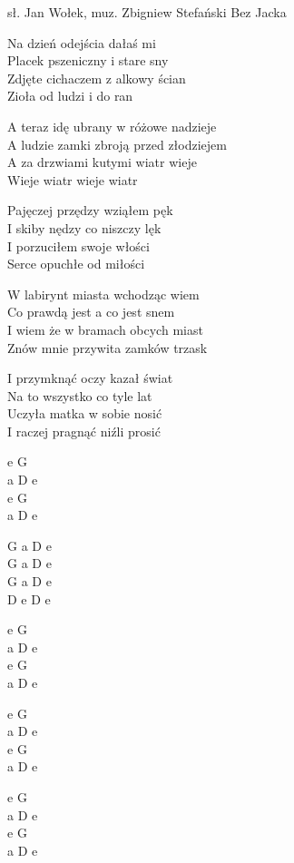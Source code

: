 {sł. Jan Wołek, muz. Zbigniew Stefański}
{Bez Jacka}
\begin{text}
Na dzień odejścia dałaś mi\\
Placek pszeniczny i stare sny\\
Zdjęte cichaczem z alkowy ścian\\
Zioła od ludzi i do ran

A teraz idę ubrany w różowe nadzieje\\
A ludzie zamki zbroją przed złodziejem\\
A za drzwiami kutymi wiatr wieje\\
Wieje wiatr wieje wiatr

Pajęczej przędzy wziąłem pęk\\
I skiby nędzy co niszczy lęk\\
I porzuciłem swoje włości\\
Serce opuchłe od miłości

W labirynt miasta wchodząc wiem\\
Co prawdą jest a co jest snem\\
I wiem że w bramach obcych miast\\
Znów mnie przywita zamków trzask

I przymknąć oczy kazał świat\\
Na to wszystko co tyle lat\\
Uczyła matka w sobie nosić\\
I raczej pragnąć niźli prosić
\end{text}
\begin{chord}
    e G\\
    a D e\\
    e G\\
    a D e

    G a D e\\
    G a D e\\
    G a D e\\
    D e D e

    e G\\
    a D e\\
    e G\\
    a D e

    e G\\
    a D e\\
    e G\\
    a D e

    e G\\
    a D e\\
    e G\\
    a D e
\end{chord}